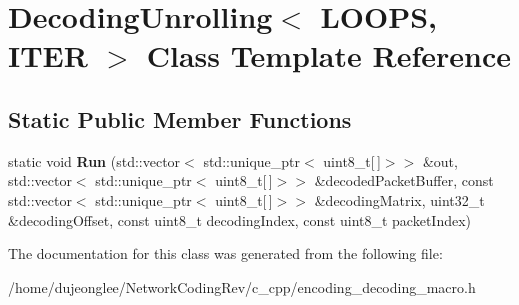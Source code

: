 \hypertarget{class_decoding_unrolling}{}\section{Decoding\+Unrolling$<$ L\+O\+O\+PS, I\+T\+ER $>$ Class Template Reference}
\label{class_decoding_unrolling}
\subsection*{Static Public Member Functions}
\begin{DoxyCompactItemize}
\item 
static void {\bfseries Run} (std\+::vector$<$ std\+::unique\+\_\+ptr$<$ uint8\+\_\+t\mbox{[}$\,$\mbox{]}$>$$>$ \&out, std\+::vector$<$ std\+::unique\+\_\+ptr$<$ uint8\+\_\+t\mbox{[}$\,$\mbox{]}$>$$>$ \&decoded\+Packet\+Buffer, const std\+::vector$<$ std\+::unique\+\_\+ptr$<$ uint8\+\_\+t\mbox{[}$\,$\mbox{]}$>$$>$ \&decoding\+Matrix, uint32\+\_\+t \&decoding\+Offset, const uint8\+\_\+t decoding\+Index, const uint8\+\_\+t packet\+Index)\hypertarget{class_decoding_unrolling_a5ece7fc8d2bcb999ad56e39caaf702bb}{}\label{class_decoding_unrolling_a5ece7fc8d2bcb999ad56e39caaf702bb}

\end{DoxyCompactItemize}


The documentation for this class was generated from the following file\+:\begin{DoxyCompactItemize}
\item 
/home/dujeonglee/\+Network\+Coding\+Rev/c\+\_\+cpp/encoding\+\_\+decoding\+\_\+macro.\+h\end{DoxyCompactItemize}
